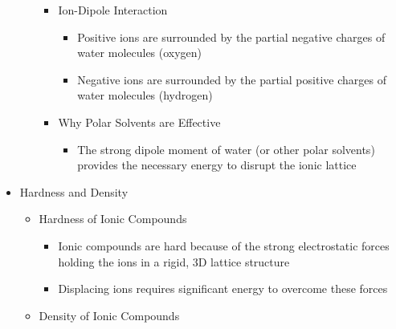 \begin{itemize}
\begin{itemize}
\begin{itemize}
\begin{itemize}
            \end{itemize}

          \item Ion-Dipole Interaction

            \begin{itemize}

              \item Positive ions are surrounded by the partial negative charges of water molecules (oxygen)

              \item Negative ions are surrounded by the partial positive charges of water molecules (hydrogen)

            \end{itemize}

          \item Why Polar Solvents are Effective

            \begin{itemize}

              \item The strong dipole moment of water (or other polar solvents) provides the necessary energy to disrupt the ionic lattice

            \end{itemize}

        \end{itemize}

    \end{itemize}

  \item Hardness and Density

    \begin{itemize}

      \item Hardness of Ionic Compounds

        \begin{itemize}

          \item Ionic compounds are hard because of the strong electrostatic forces holding the ions in a rigid, 3D lattice structure

          \item Displacing ions requires significant energy to overcome these forces

        \end{itemize}

      \item Density of Ionic Compounds


\end{itemize}
\end{itemize}
